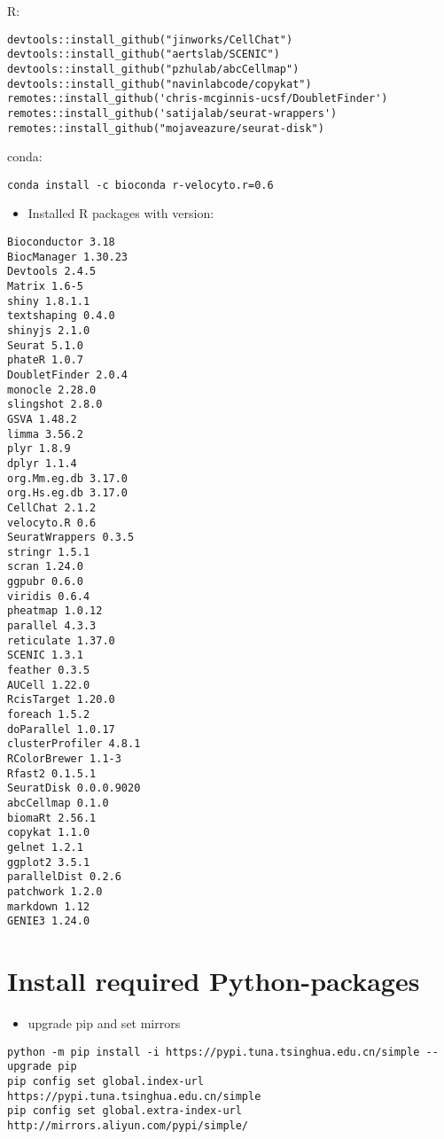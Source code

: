 \documentclass[
]{book}
\providecommand{\tightlist}{%
  \setlength{\itemsep}{0pt}\setlength{\parskip}{0pt}}
\begin{document}
R:

\begin{verbatim}
devtools::install_github("jinworks/CellChat")
devtools::install_github("aertslab/SCENIC")
devtools::install_github("pzhulab/abcCellmap")
devtools::install_github("navinlabcode/copykat")
remotes::install_github('chris-mcginnis-ucsf/DoubletFinder')
remotes::install_github('satijalab/seurat-wrappers')
remotes::install_github("mojaveazure/seurat-disk")
\end{verbatim}

conda:

\begin{verbatim}
conda install -c bioconda r-velocyto.r=0.6
\end{verbatim}

\begin{itemize}
\tightlist
\item
  Installed R packages with version:
\end{itemize}

\begin{verbatim}
Bioconductor 3.18 
BiocManager 1.30.23
Devtools 2.4.5
Matrix 1.6-5
shiny 1.8.1.1
textshaping 0.4.0
shinyjs 2.1.0
Seurat 5.1.0
phateR 1.0.7
DoubletFinder 2.0.4
monocle 2.28.0
slingshot 2.8.0
GSVA 1.48.2
limma 3.56.2
plyr 1.8.9
dplyr 1.1.4
org.Mm.eg.db 3.17.0
org.Hs.eg.db 3.17.0
CellChat 2.1.2
velocyto.R 0.6
SeuratWrappers 0.3.5
stringr 1.5.1
scran 1.24.0
ggpubr 0.6.0
viridis 0.6.4
pheatmap 1.0.12
parallel 4.3.3
reticulate 1.37.0
SCENIC 1.3.1
feather 0.3.5
AUCell 1.22.0
RcisTarget 1.20.0
foreach 1.5.2
doParallel 1.0.17
clusterProfiler 4.8.1
RColorBrewer 1.1-3
Rfast2 0.1.5.1
SeuratDisk 0.0.0.9020
abcCellmap 0.1.0 
biomaRt 2.56.1
copykat 1.1.0
gelnet 1.2.1
ggplot2 3.5.1
parallelDist 0.2.6
patchwork 1.2.0
markdown 1.12
GENIE3 1.24.0
\end{verbatim}

\hypertarget{install-required-python-packages}{%
\section{Install required Python-packages}\label{install-required-python-packages}}

\begin{itemize}
\tightlist
\item
  upgrade pip and set mirrors
\end{itemize}

\begin{verbatim}
python -m pip install -i https://pypi.tuna.tsinghua.edu.cn/simple --upgrade pip
pip config set global.index-url https://pypi.tuna.tsinghua.edu.cn/simple
pip config set global.extra-index-url http://mirrors.aliyun.com/pypi/simple/
\end{verbatim}
\end{document}
